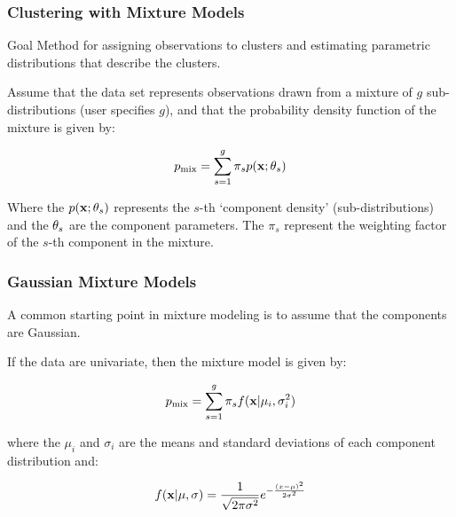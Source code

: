 \documentclass{beamer}
\begin{document}
\begin{frame}
  \frametitle{Clustering with Mixture Models}

\begin{block}{Goal}
Method for assigning observations to clusters and estimating parametric distributions that describe the clusters.
\end{block}

    Assume that the data set represents observations drawn from a mixture of $g$ sub-distributions (user specifies $g$), and that the probability density function of the mixture is given by:
    
\[
p_{\mathrm{mix}} = \sum_{s=1}^g \pi_s p(\mathbf{x};\mathbf{\theta}_s)
\]

Where the $p(\mathbf{x};\mathbf{\theta}_s)$ represents the $s$-th `component density' (sub-distributions) and the $\mathbf{\theta}_s$ are the component parameters.  The $\pi_s$ represent the weighting factor of the $s$-th component in the mixture.

\end{frame}

{ 

}

\begin{frame}
  \frametitle{Gaussian Mixture Models}

A common starting point in mixture modeling is to assume that the components are Gaussian.

If the data are univariate, then the mixture model is given by:

\[
p_{\mathrm{mix}} = \sum_{s=1}^g \pi_s f(\mathbf{x}|\mu_i, \sigma_i^2)
\]

where the $\mu_i$ and $\sigma_i$ are the means and standard deviations of each component distribution and:

\[
f(\mathbf{x}|\mu, \sigma) = \frac{1}{\sqrt{2\pi\sigma^2}}e^{-\frac{(x-\mu)^2}{2\sigma^2}}
\]

\end{frame}

\end{document}
